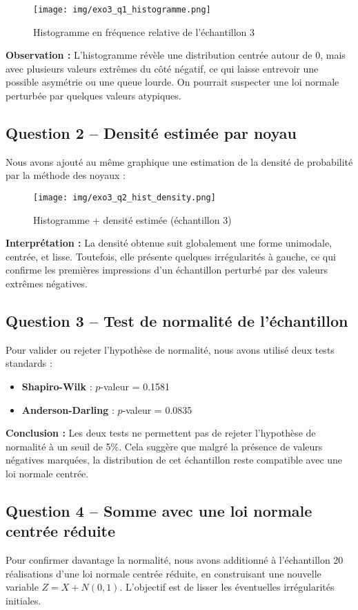 \documentclass[a4paper,11pt]{article}
\begin{document}
\begin{figure}[H]
    \centering
    \texttt{[image: img/exo3\_q1\_histogramme.png]}
    \caption{Histogramme en fréquence relative de l’échantillon 3}
\end{figure}

\textbf{Observation :} L’histogramme révèle une distribution centrée autour de 0, mais avec plusieurs valeurs extrêmes du côté négatif, ce qui laisse entrevoir une possible asymétrie ou une queue lourde. On pourrait suspecter une loi normale perturbée par quelques valeurs atypiques.

\subsection*{Question 2 – Densité estimée par noyau}
Nous avons ajouté au même graphique une estimation de la densité de probabilité par la méthode des noyaux :

\begin{figure}[H]
    \centering
    \texttt{[image: img/exo3\_q2\_hist\_density.png]}
    \caption{Histogramme + densité estimée (échantillon 3)}
\end{figure}

\textbf{Interprétation :} La densité obtenue suit globalement une forme unimodale, centrée, et lisse. Toutefois, elle présente quelques irrégularités à gauche, ce qui confirme les premières impressions d’un échantillon perturbé par des valeurs extrêmes négatives.

\subsection*{Question 3 – Test de normalité de l’échantillon}
Pour valider ou rejeter l’hypothèse de normalité, nous avons utilisé deux tests standards :

\begin{itemize}
    \item \textbf{Shapiro-Wilk} : $p$-valeur = 0.1581
    \item \textbf{Anderson-Darling} : $p$-valeur = 0.0835
\end{itemize}

\textbf{Conclusion :} Les deux tests ne permettent pas de rejeter l’hypothèse de normalité à un seuil de 5\%. Cela suggère que malgré la présence de valeurs négatives marquées, la distribution de cet échantillon reste compatible avec une loi normale centrée.

\subsection*{Question 4 – Somme avec une loi normale centrée réduite}
Pour confirmer davantage la normalité, nous avons additionné à l’échantillon 20 réalisations d’une loi normale centrée réduite, en construisant une nouvelle variable $Z = X + N(0,1)$. L’objectif est de lisser les éventuelles irrégularités initiales.
\end{document}
